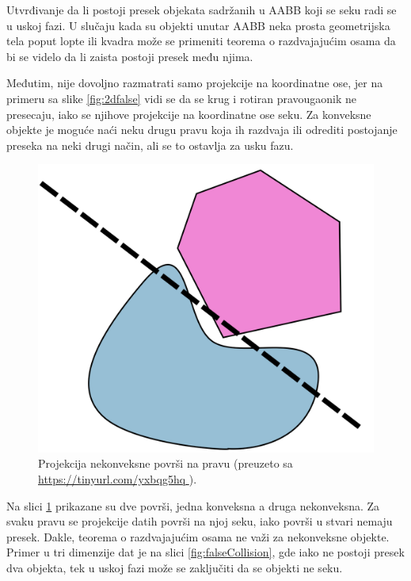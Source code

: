 \documentclass[12pt,oneside]{memoir}
\begin{document}
Utvrđivanje da li postoji presek objekata sadržanih u AABB koji se seku radi se u uskoj fazi.
U slučaju kada su objekti unutar AABB neka prosta geometrijska tela poput
lopte ili kvadra može se primeniti teorema o razdvajajućim osama da bi se videlo da li zaista postoji presek među njima. 


Međutim, nije dovoljno razmatrati samo projekcije na koordinatne ose, 
jer na primeru sa slike \ref{fig:2dfalse} vidi se da se krug i rotiran pravougaonik ne presecaju, iako se njihove projekcije 
na koordinatne ose seku. Za konveksne objekte je moguće naći neku drugu pravu koja ih razdvaja ili odrediti postojanje preseka 
na neki drugi način, ali se to ostavlja za usku fazu.

\begin{figure}[h!]
	\centering
	\includegraphics[scale=0.17]{theorem_counterexample.png}
	\caption{Projekcija nekonveksne površi na pravu (preuzeto sa \url{ https://tinyurl.com/yxbqg5hq }).}
	
	\label{fig:counter}
\end{figure}

Na slici \ref{fig:counter} prikazane su dve površi, jedna konveksna a druga nekonveksna. 
Za svaku pravu se projekcije datih površi na njoj seku, iako površi u stvari nemaju presek.
Dakle, teorema o razdvajajućim osama ne važi za nekonveksne objekte. 
Primer u tri dimenzije dat je na slici \ref{fig:falseCollision}, gde iako ne postoji presek dva objekta, 
tek u uskoj fazi može se zaključiti da se objekti ne seku.
\end{document}
